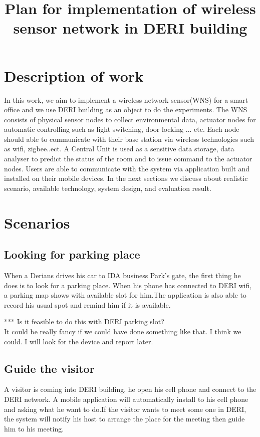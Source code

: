 \documentclass[a4paper, 12pt]{article}
\begin{document}
\title{Plan for implementation of wireless sensor network in DERI building}
\maketitle
\section{Description of work}
In this work, we aim to implement a wireless network sensor(WNS) for a smart office and we use DERI building as an object to do the experiments. The WNS consists of physical sensor nodes to collect environmental data, actuator nodes for automatic controlling such as light switching, door locking ... etc.  Each node should able to communicate with their base station via wireless technologies such as wifi, zigbee..ect. A Central Unit is used as a sensitive data storage, data analyser to predict the status of the room and to  issue command to the actuator nodes. Users are able to communicate with the system via application built and installed on their mobile devices. In the next sections we discuss about realistic scenario, available technology, system design, and evaluation result.


\section{Scenarios}
\subsection{Looking for parking place}
 When a Derians drives his car to IDA business Park's gate, the first thing he does is to look for a parking place. When his phone has connected to DERI wifi, a parking map shows with available slot for him.The application is also able to record his usual spot and remind him if it is available.

*** Is it feasible to do this with DERI parking slot?\\
It could be really fancy if we could have done something like that. I think we could. I will look for the device and report later.\\

\subsection{Guide the visitor}
A visitor is coming into DERI building, he open his cell phone and connect to the DERI network. A mobile application will automatically install to his cell phone and asking what he want to do.If the visitor wants to meet some one in DERI, the system will notify his host to arrange the place for the meeting then guide him to his meeting.\\
\end{document}
